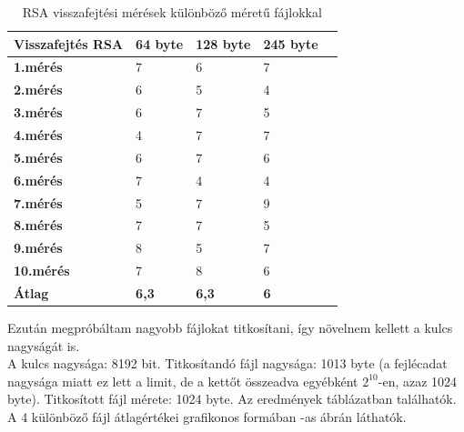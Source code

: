 \begin{table}[H]
	\centering
	\caption{RSA visszafejtési mérések különböző méretű fájlokkal}
	\label{tab:dec_rsa}
	\medskip
	\begin{tabular}{|p{2.4cm}|p{2cm}|p{2cm}|p{2cm}|p{2cm}|}
		\hline
		\textbf{Visszafejtés} \newline \textbf{RSA} & \textbf{64 byte} & \textbf{128 byte} & \textbf{245 byte}\\
		\hline
		\textbf{1.mérés} & 7 & 6 & 7\\
		\hline
		\textbf{2.mérés} & 6 & 5 & 4\\
		\hline
		\textbf{3.mérés} & 6 & 7 & 5\\
		\hline
		\textbf{4.mérés} & 4 & 7 & 7\\
		\hline
		\textbf{5.mérés} & 6 & 7 & 6\\
		\hline
		\textbf{6.mérés} & 7 & 4 & 4\\
		\hline
		\textbf{7.mérés} & 5 & 7 & 9\\
		\hline
		\textbf{8.mérés} & 7 & 7 & 5\\
		\hline
		\textbf{9.mérés} & 8 & 5 & 7\\
		\hline
		\textbf{10.mérés} & 7 & 8 & 6\\
		\hline
		\hline
		\textbf{Átlag} & \textbf{6,3} & \textbf{6,3} & \textbf{6}\\
		\hline
	\end{tabular}
\end{table}

\noindent Ezután megpróbáltam nagyobb fájlokat titkosítani, így növelnem kellett a kulcs nagyságát is.
\vspace{5pt} \\ A kulcs nagysága: 8192 bit. Titkosítandó fájl nagysága: 1013 byte (a fejlécadat nagysága miatt ez lett a limit, de a kettőt összeadva egyébként $2^{10}$-en, azaz 1024 byte). Titkosított fájl mérete: 1024 byte. Az eredmények   táblázatban találhatók. A 4 különböző fájl átlagértékei grafikonos formában -as ábrán láthatók.

